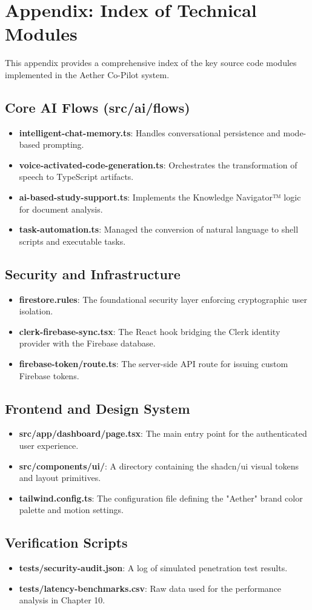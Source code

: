\chapter{Appendix: Index of Technical Modules}

This appendix provides a comprehensive index of the key source code modules implemented in the Aether Co-Pilot system.

\section{Core AI Flows (src/ai/flows)}
\begin{itemize}
    \item \textbf{intelligent-chat-memory.ts}: Handles conversational persistence and mode-based prompting.
    \item \textbf{voice-activated-code-generation.ts}: Orchestrates the transformation of speech to TypeScript artifacts.
    \item \textbf{ai-based-study-support.ts}: Implements the Knowledge Navigator™ logic for document analysis.
    \item \textbf{task-automation.ts}: Managed the conversion of natural language to shell scripts and executable tasks.
\end{itemize}

\section{Security and Infrastructure}
\begin{itemize}
    \item \textbf{firestore.rules}: The foundational security layer enforcing cryptographic user isolation.
    \item \textbf{clerk-firebase-sync.tsx}: The React hook bridging the Clerk identity provider with the Firebase database.
    \item \textbf{firebase-token/route.ts}: The server-side API route for issuing custom Firebase tokens.
\end{itemize}

\section{Frontend and Design System}
\begin{itemize}
    \item \textbf{src/app/dashboard/page.tsx}: The main entry point for the authenticated user experience.
    \item \textbf{src/components/ui/}: A directory containing the shadcn/ui visual tokens and layout primitives.
    \item \textbf{tailwind.config.ts}: The configuration file defining the "Aether" brand color palette and motion settings.
\end{itemize}

\section{Verification Scripts}
\begin{itemize}
    \item \textbf{tests/security-audit.json}: A log of simulated penetration test results.
    \item \textbf{tests/latency-benchmarks.csv}: Raw data used for the performance analysis in Chapter 10.
\end{itemize}

\newpage

